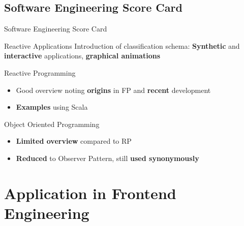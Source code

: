 \documentclass{beamer}
\begin{document}
\subsection*{Software Engineering Score Card}
\begin{frame}{Software Engineering Score Card}
	\begin{exampleblock}{ Reactive Applications}
		Introduction of classification schema: \textbf{Synthetic} and \textbf{interactive} applications, \textbf{graphical animations}
	\end{exampleblock}
	\begin{exampleblock}{ Reactive Programming}
		\begin{itemize}
			\item Good overview noting \textbf{origins} in FP and \textbf{recent} development
			\item \textbf{Examples} using Scala
		\end{itemize}
	\end{exampleblock}

	\begin{alertblock}{ Object Oriented Programming}
		\begin{itemize}
			\item \textbf{Limited overview} compared to RP
			\item \textbf{Reduced} to Observer Pattern, still \textbf{used synonymously}
		\end{itemize}
	\end{alertblock}
\end{frame}



\section{Application in Frontend Engineering}
\end{document}

